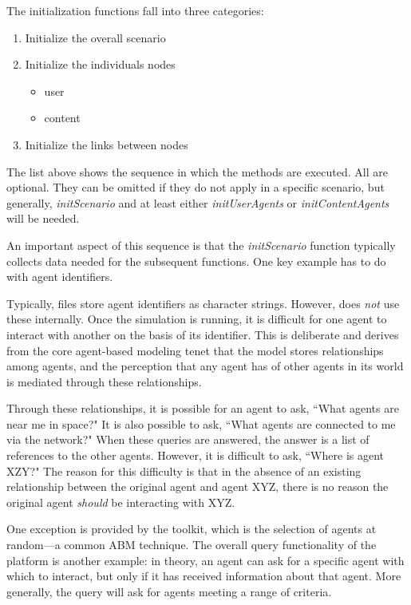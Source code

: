 The initialization functions fall into three categories: 
\begin{enumerate} 
	\item Initialize the overall scenario
	\item Initialize the individuals nodes 
		\begin{itemize} 
			\item user
			\item content
		\end{itemize}
	\item Initialize the links between nodes
\end{enumerate}


\par The list above shows the sequence in which the methods are executed. All are optional. They can be omitted if they do not apply in a specific scenario, but generally, \textit{initScenario} and at least either \textit{initUserAgents} or \textit{initContentAgents} will be needed.
\par An important aspect of this sequence is that the \textit{initScenario} function typically collects data needed for the subsequent functions. One key example has to do with agent identifiers.
\par Typically, files store agent identifiers as character strings. However, \rhpc does \textit{not} use these internally.  Once the simulation is running, it is difficult for one agent to interact with another on the basis of its identifier.  This is deliberate and derives from the core agent-based modeling tenet that the model stores relationships among agents, and the perception that any agent has of other agents in its world is mediated through these relationships.

Through these relationships, it is possible for an agent to ask, ``What agents are near me in space?"  It is also possible to ask, ``What agents are connected to me via the network?"  When these queries are answered, the answer is a list of references to the other agents.  However, it is difficult to ask, ``Where is agent XZY?" 
The reason for this difficulty is that in the absence of an existing relationship between the original agent and agent XYZ, there is no reason the original agent \textit{should} be interacting with XYZ. 

One exception is provided by the toolkit, which is the selection of agents at random---a common ABM technique. The overall query functionality of the platform is another example: in theory, an agent can ask for a specific agent with which to interact, but only if it has received information about that agent. More generally, the query will ask for agents meeting a range of criteria.

